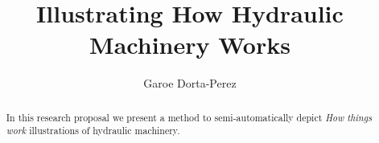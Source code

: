 \documentclass[11pt]{report}
\title{ Illustrating How Hydraulic Machinery Works } \author{Garoe Dorta-Perez}
\begin{document}
\maketitle
\begin{abstract}
In this research proposal we present a method to semi-automatically depict \textit{How things work} illustrations of hydraulic machinery. \end{abstract}















\end{document}
